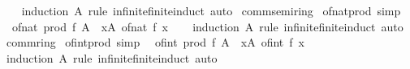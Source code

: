\begin{isabellebody}
\ \ %
\endisadelimproof
%
\isatagproof
{}\isamarkupfalse%
\ {\isacharparenleft}{\kern0pt}induction\ A\ rule{\isacharcolon}{\kern0pt}\ infinite{\isacharunderscore}{\kern0pt}finite{\isacharunderscore}{\kern0pt}induct{\isacharparenright}{\kern0pt}\ auto%
\endisatagproof
{\isafoldproof}%
%
\isadelimproof
\isanewline
%
\endisadelimproof
\isanewline
{}\isamarkupfalse%
\isanewline
\isanewline
{}\isamarkupfalse%
\ comm{\isacharunderscore}{\kern0pt}semiring{\isacharunderscore}{\kern0pt}{}\isanewline
{}\isanewline
\isanewline
{}\isamarkupfalse%
\ of{\isacharunderscore}{\kern0pt}nat{\isacharunderscore}{\kern0pt}prod\ {\isacharbrackleft}{\kern0pt}simp{\isacharbrackright}{\kern0pt}{\isacharcolon}{\kern0pt}\isanewline
\ \ {\isachardoublequoteopen}of{\isacharunderscore}{\kern0pt}nat\ {\isacharparenleft}{\kern0pt}prod\ f\ A{\isacharparenright}{\kern0pt}\ {\isacharequal}{\kern0pt}\ {\isacharparenleft}{\kern0pt}{\isasymProd}x{\isasymin}A{\isachardot}{\kern0pt}\ of{\isacharunderscore}{\kern0pt}nat\ {\isacharparenleft}{\kern0pt}f\ x{\isacharparenright}{\kern0pt}{\isacharparenright}{\kern0pt}{\isachardoublequoteclose}\isanewline
%
\isadelimproof
\ \ %
\endisadelimproof
%
\isatagproof
{}\isamarkupfalse%
\ {\isacharparenleft}{\kern0pt}induction\ A\ rule{\isacharcolon}{\kern0pt}\ infinite{\isacharunderscore}{\kern0pt}finite{\isacharunderscore}{\kern0pt}induct{\isacharparenright}{\kern0pt}\ auto%
\endisatagproof
{\isafoldproof}%
%
\isadelimproof
\isanewline
%
\endisadelimproof
\isanewline
{}\isamarkupfalse%
\isanewline
\isanewline
{}\isamarkupfalse%
\ comm{\isacharunderscore}{\kern0pt}ring{\isacharunderscore}{\kern0pt}{}\isanewline
{}\isanewline
\isanewline
{}\isamarkupfalse%
\ of{\isacharunderscore}{\kern0pt}int{\isacharunderscore}{\kern0pt}prod\ {\isacharbrackleft}{\kern0pt}simp{\isacharbrackright}{\kern0pt}{\isacharcolon}{\kern0pt}\isanewline
\ \ {\isachardoublequoteopen}of{\isacharunderscore}{\kern0pt}int\ {\isacharparenleft}{\kern0pt}prod\ f\ A{\isacharparenright}{\kern0pt}\ {\isacharequal}{\kern0pt}\ {\isacharparenleft}{\kern0pt}{\isasymProd}x{\isasymin}A{\isachardot}{\kern0pt}\ of{\isacharunderscore}{\kern0pt}int\ {\isacharparenleft}{\kern0pt}f\ x{\isacharparenright}{\kern0pt}{\isacharparenright}{\kern0pt}{\isachardoublequoteclose}\isanewline
%
\isadelimproof
\ \ %
\endisadelimproof
%
\isatagproof
{}\isamarkupfalse%
\ {\isacharparenleft}{\kern0pt}induction\ A\ rule{\isacharcolon}{\kern0pt}\ infinite{\isacharunderscore}{\kern0pt}finite{\isacharunderscore}{\kern0pt}induct{\isacharparenright}{\kern0pt}\ auto%

\end{isabellebody}
